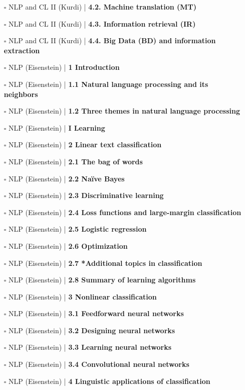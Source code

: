 \documentclass[a4, landscape, 12pt]{article}
\newcommand{\checkbox}{$\square$}%
\begin{document}
\begin{itemize}
{}
\item [\checkbox]  NLP and CL II (Kurdi) | \textbf{ 4.2. Machine translation (MT)
}
\item [\checkbox]  NLP and CL II (Kurdi) | \textbf{ 4.3. Information retrieval (IR)
}
\item [\checkbox]  NLP and CL II (Kurdi) | \textbf{ 4.4. Big Data (BD) and information extraction
}
\item [\checkbox]  NLP (Eisenstein) | \textbf{ 1 Introduction
}
\item [\checkbox]  NLP (Eisenstein) | \textbf{ 1.1 Natural language processing and its neighbors
}
\item [\checkbox]  NLP (Eisenstein) | \textbf{ 1.2 Three themes in natural language processing
}
\item [\checkbox]  NLP (Eisenstein) | \textbf{ I Learning
}
\item [\checkbox]  NLP (Eisenstein) | \textbf{ 2 Linear text classification
}
\item [\checkbox]  NLP (Eisenstein) | \textbf{ 2.1 The bag of words
}
\item [\checkbox]  NLP (Eisenstein) | \textbf{ 2.2 Naïve Bayes
}
\item [\checkbox]  NLP (Eisenstein) | \textbf{ 2.3 Discriminative learning
}
\item [\checkbox]  NLP (Eisenstein) | \textbf{ 2.4 Loss functions and large-margin classification
}
\item [\checkbox]  NLP (Eisenstein) | \textbf{ 2.5 Logistic regression
}
\item [\checkbox]  NLP (Eisenstein) | \textbf{ 2.6 Optimization
}
\item [\checkbox]  NLP (Eisenstein) | \textbf{ 2.7 *Additional topics in classification
}
\item [\checkbox]  NLP (Eisenstein) | \textbf{ 2.8 Summary of learning algorithms
}
\item [\checkbox]  NLP (Eisenstein) | \textbf{ 3 Nonlinear classification
}
\item [\checkbox]  NLP (Eisenstein) | \textbf{ 3.1 Feedforward neural networks
}
\item [\checkbox]  NLP (Eisenstein) | \textbf{ 3.2 Designing neural networks
}
\item [\checkbox]  NLP (Eisenstein) | \textbf{ 3.3 Learning neural networks
}
\item [\checkbox]  NLP (Eisenstein) | \textbf{ 3.4 Convolutional neural networks
}
\item [\checkbox]  NLP (Eisenstein) | \textbf{ 4 Linguistic applications of classification
}
\end{itemize}
\end{document}
